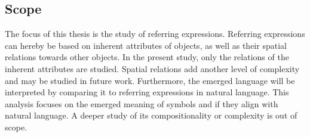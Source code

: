 \subsection{Scope}
The focus of this thesis is the study of referring expressions.
Referring expressions can hereby be based on inherent attributes of objects, as well as their spatial relations towards other objects.
In the present study, only the relations of the inherent attributes are studied.
Spatial relations add another level of complexity and may be studied in future work.
Furthermore, the emerged language will be interpreted by comparing it to referring expressions in natural language.
This analysis focuses on the emerged meaning of symbols and if they align with natural language.
A deeper study of its compositionality or complexity is out of scope.
